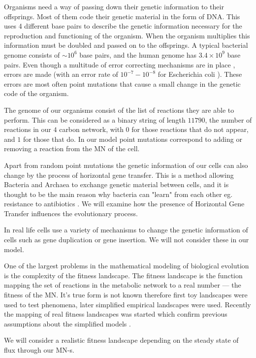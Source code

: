 \documentclass[a4paper,12pt]{article}
\begin{document}
	Organisms need a way of passing down their genetic information to their offsprings. 
	Most of them code their genetic material in the form of DNA. This uses 4 different base pairs to describe the genetic information necessary for the reproduction and functioning of the organism. When the organism multiplies this information must be doubled and passed on to the offsprings. A typical bacterial genome consists of $\sim 10^6$ base pairs, and the human genome has $3.4 \times 10^9$ base pairs. Even though a multitude of error correcting mechanisms are in place \cite{dnarepair}, errors are made (with an error rate of $10^{-7} - 10^{-8}$ for Escherichia coli \cite{dnaerrorrate}). These errors are most often point mutations that cause a small change in the genetic code of the organism.
	
	The genome of our organisms consist of the list of reactions they are able to perform. This can be considered as a binary string of length $11790$, the number of reactions in our $4$ carbon network, with $0$ for those reactions that do not appear, and $1$ for those that do. In our model point mutations correspond to adding or removing a reaction from the MN of the cell.

	Apart from random point mutations  the genetic information of our cells can also change by the process of horizontal gene transfer. This is a method allowing Bacteria and Archaea to exchange genetic material between cells, and it is thought to be the main reason why bacteria can "learn" from each other eg. resistance to antibiotics \cite{horizontalAntibiotics}\cite{horizontalgenetransfer}. We will examine how the presence of Horizontal Gene Transfer influences the evolutionary process.

	In real life cells use a variety of mechanisms to change the genetic information of cells such as gene duplication or gene insertion. We will not consider these in our model. 


	One of the largest problems in the mathematical modeling of biological evolution is the complexity of the fitness landscape. The fitness landscape is the function mapping the set of reactions in the metabolic network to a real number --- the fitness of the MN. It's true form is not known therefore first toy landscapes were used to test phenomena, later simplified empirical landscapes were used. Recently the mapping of real fitness landscapes was started which confirm previous assumptions about the simplified models \cite{fitnesslandscape}. 

	We will consider a realistic fitness landscape depending on the steady state of flux through our MN-s. 
\end{document}
